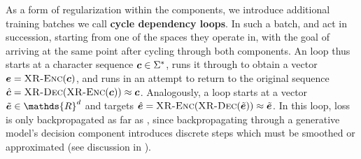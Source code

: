 As a form of regularization within the \tokdetok{} components, we introduce additional training batches we call \textbf{cycle dependency loops}.
In such a batch, \tok{} and \detok{} act in succession, starting from one of the spaces they operate in, with the goal of arriving at the same point after cycling through both components.
An \textbf{\tdloop} loop thus starts at a character sequence $\bm{c}\in{\Sigma^*}$, runs it through \tok{} to obtain a vector $\bm{e}=\textsc{XR-Enc}(\bm{c})$, and runs \detok{} in an attempt to return to the original sequence $\hat{\bm{c}}=\textsc{XR-Dec}(\textsc{XR-Enc}(\bm{c}))\approx \bm{c}$.
Analogously, a \textbf{\dtloop} loop starts at a vector $\tilde{\ve}\in\mathds{R}^{d}$ and targets $\hat{\bm{e}}=\textsc{XR-Enc}(\textsc{XR-Dec}(\tilde{\bm{e}}))\approx \tilde{\bm{e}}$.
In this loop, loss is only backpropagated as far as \tok{}, since backpropagating through a generative model's decision component introduces discrete steps which must be smoothed or approximated (see discussion in ).


